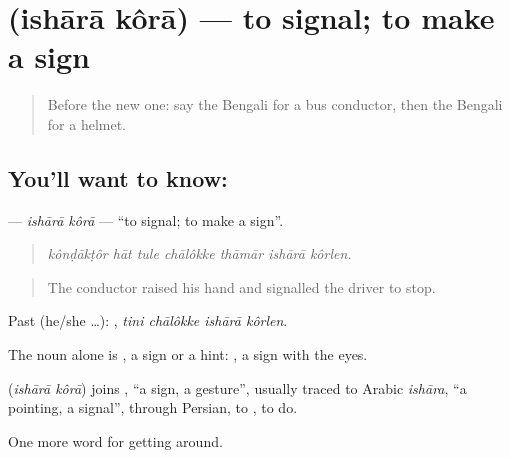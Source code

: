 \section[\texorpdfstring{\bn{ইশারা} \bn{করা} (ishārā kôrā)}{ইশারা করা (ishārā kôrā)}]{  (ishārā kôrā) — to signal; to make a sign}

\label{lesson:BN-C389-ishara-kora}



\begin{quote}
Before the new one: say the Bengali for a bus conductor, then the Bengali for a helmet.
\end{quote}

\subsection*{You'll want to know:  }
\textbf{ } — \emph{ishārā kôrā} — \textquotedblleft{}to signal; to make a sign\textquotedblright{}.

\begin{quote}
      
\end{quote}

\begin{quote}
\emph{kônḍākṭôr hāt tule chālôkke thāmār ishārā kôrlen.}
\end{quote}

\begin{quote}
The conductor raised his hand and signalled the driver to stop.
\end{quote}

Past (he/she …):    , \emph{tini chālôkke ishārā kôrlen}.

The noun alone is , a sign or a hint:  , a sign with the eyes.

\begin{cousinweb}
\textbf{ } (\emph{ishārā kôrā}) joins , \textquotedblleft{}a sign, a gesture\textquotedblright{}, usually traced to Arabic \emph{ishāra}, \textquotedblleft{}a pointing, a signal\textquotedblright{}, through Persian, to , to do.
\end{cousinweb}

\begin{grammarlens}[title={What you've built}]
One more word for getting around.
\end{grammarlens}

